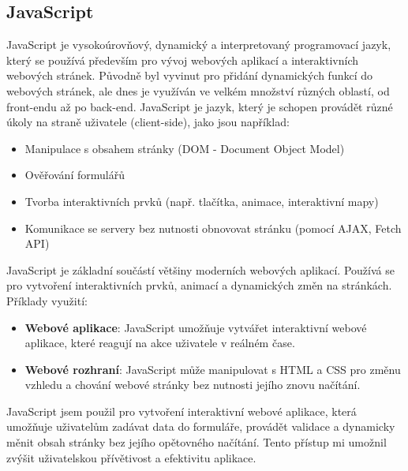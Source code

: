 \documentclass[12pt, a4paper]{report}
\begin{document}
\subsection{JavaScript}
JavaScript je vysokoúrovňový, dynamický a interpretovaný programovací jazyk, který se používá především pro vývoj webových aplikací a interaktivních webových stránek. Původně byl vyvinut pro přidání dynamických funkcí do webových stránek, ale dnes je využíván ve velkém množství různých oblastí, od front-endu až po back-end.
JavaScript je jazyk, který je schopen provádět různé úkoly na straně uživatele (client-side), jako jsou například:
\begin{itemize}
    \item Manipulace s obsahem stránky (DOM - Document Object Model)
    \item Ověřování formulářů
    \item Tvorba interaktivních prvků (např. tlačítka, animace, interaktivní mapy)
    \item Komunikace se servery bez nutnosti obnovovat stránku (pomocí AJAX, Fetch API)
\end{itemize}
JavaScript je základní součástí většiny moderních webových aplikací. Používá se pro vytvoření interaktivních prvků, animací a dynamických změn na stránkách. Příklady využití:
\begin{itemize}
    \item \textbf{Webové aplikace}: JavaScript umožňuje vytvářet interaktivní webové aplikace, které reagují na akce uživatele v reálném čase.
    \item \textbf{Webové rozhraní}: JavaScript může manipulovat s HTML a CSS pro změnu vzhledu a chování webové stránky bez nutnosti jejího znovu načítání.
\end{itemize}
JavaScript jsem použil pro vytvoření interaktivní webové aplikace, která umožňuje uživatelům zadávat data do formuláře, provádět validace a dynamicky měnit obsah stránky bez jejího opětovného načítání. Tento přístup mi umožnil zvýšit uživatelskou přívětivost a efektivitu aplikace.
\newpage
\end{document}
